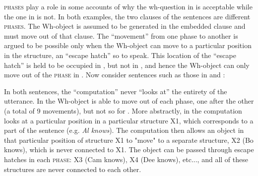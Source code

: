 \textsc{phases} play a role in some accounts of why the wh-question in  is acceptable while the one in  is not. In both examples, the two clauses of the sentences are different \textsc{phases}. The Wh-object is assumed to be generated in the embedded clause and must move out of that clause. The “movement” from one phase to another is argued to be possible only when the Wh-object can move to a particular position in the structure, an “escape hatch” so to speak. This location of the “escape hatch” is held to be occupied in , but not in , and hence the Wh-object can only move out of the \textsc{phase} in . Now consider sentences such as those in  and : 

\ea\label{ex:5:x3}
\label{ex:5:x3a}
\label{ex:5:x3b}
\z
\z

\ea\label{ex:5:x4}
\label{ex:5:x4a}
\label{ex:5:x4b}
\z
\z

  In both sentences, the “computation” never “looks at” the entirety of the utterance. In  the Wh-object is able to move out of each phase, one after the other (a total of 9 movements), but not so for . More abstractly, in  the computation looks at a particular position in a particular structure X1, which corresponds to a part of the sentence (e.g. \textit{Al knows}). The computation then allows an object in that particular position of structure X1 to "move" to a separate structure, X2 (Bo knows), which is never connected to X1. The object can be passed through escape hatches in each \textsc{phase}: X3 (Cam knows), X4 (Dee knows), etc..., and all of these structures are never connected to each other.
  
